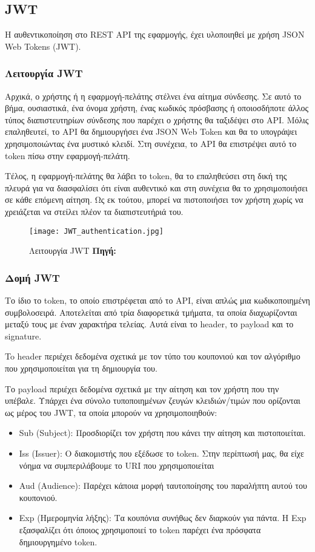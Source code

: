 \subsection{JWT}
Η αυθεντικοποίηση στο REST API της εφαρμογής, έχει υλοποιηθεί με χρήση JSON Web Tokens (JWT).

\subsubsection{Λειτουργία JWT}
Αρχικά, ο χρήστης ή η εφαρμογή-πελάτης στέλνει ένα αίτημα σύνδεσης. Σε αυτό το βήμα, ουσιαστικά, ένα όνομα χρήστη, ένας κωδικός πρόσβασης ή οποιοσδήποτε άλλος τύπος διαπιστευτηρίων σύνδεσης που παρέχει ο χρήστης θα ταξιδέψει στο API. Μόλις επαληθευτεί, το API θα δημιουργήσει ένα JSON Web Token και θα το υπογράψει χρησιμοποιώντας ένα μυστικό κλειδί. Στη συνέχεια, το API θα επιστρέψει αυτό το token πίσω στην εφαρμογή-πελάτη.

Τέλος, η εφαρμογή-πελάτης θα λάβει το token, θα το επαληθεύσει στη δική της πλευρά για να διασφαλίσει ότι είναι αυθεντικό και στη συνέχεια θα το χρησιμοποιήσει σε κάθε επόμενη αίτηση. Ως εκ τούτου, μπορεί να πιστοποιήσει τον χρήστη χωρίς να χρειάζεται να στείλει πλέον τα διαπιστευτήριά του.

\begin{figure}[h]
	\centering
	\texttt{[image: JWT\_authentication.jpg]}
	\caption[{Λειτουργία JWT}]{Λειτουργία JWT \textbf{Πηγή:} \cite{fig_JWT_authentication}}
	\label{fig:JWT_authentication}
\end{figure}

\subsubsection{Δομή JWT}
Το ίδιο το token, το οποίο επιστρέφεται από το API, είναι απλώς μια κωδικοποιημένη συμβολοσειρά. Αποτελείται από τρία διαφορετικά τμήματα, τα οποία διαχωρίζονται μεταξύ τους με έναν χαρακτήρα τελείας. Αυτά είναι το header, το payload και το signature.

To header περιέχει δεδομένα σχετικά με τον τύπο του κουπονιού και τον αλγόριθμο που χρησιμοποιείται για τη δημιουργία του.

Το payload περιέχει δεδομένα σχετικά με την αίτηση και τον χρήστη που την υπέβαλε. Υπάρχει ένα σύνολο τυποποιημένων ζευγών κλειδιών/τιμών που ορίζονται ως μέρος του JWT, τα οποία μπορούν να χρησιμοποιηθούν:

\begin{itemize}
  \item Sub (Subject): Προσδιορίζει τον χρήστη που κάνει την αίτηση και πιστοποιείται.
  \item Iss (Issuer): Ο διακομιστής που εξέδωσε το token. Στην περίπτωσή μας, θα είχε νόημα να συμπεριλάβουμε το URI που χρησιμοποιείται
  \item Aud (Audience): Παρέχει κάποια μορφή ταυτοποίησης του παραλήπτη αυτού του κουπονιού.
  \item Exp (Ημερομηνία λήξης): Τα κουπόνια συνήθως δεν διαρκούν για πάντα. Η Exp εξασφαλίζει ότι όποιος χρησιμοποιεί το token παρέχει ένα πρόσφατα δημιουργημένο token.
\end{itemize}

